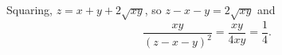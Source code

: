Squaring, $z=x+y+2\sqrt{xy}$, so $z-x-y=2\sqrt{xy}$ and
\[\dfrac{xy}{(z-x-y)^2}=\dfrac{xy}{4xy}=\boxed{\dfrac14}.\]
